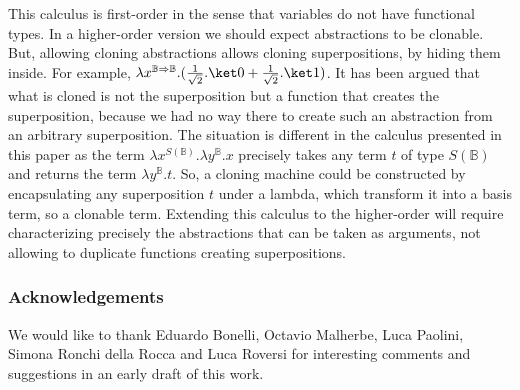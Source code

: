 \documentclass[preprint]{elsarticle}
\newcommand\B{\ensuremath{\mathbb B}}
\newcommand\pair[2]{({#1}+{#2})}
\begin{document}
This calculus is first-order in the sense that variables do not have functional
types. In a higher-order version we should expect abstractions to be clonable.
But, allowing cloning abstractions allows cloning superpositions, by hiding them
inside. For example, $\lambda x^{\B\Rightarrow\B}.\pair{\frac 1{\sqrt 2}.\ket
  0}{\frac 1{\sqrt 2}.\ket 1}$. It has been argued
\cite{ArrighiDowekRTA08,ArrighiDiazcaroValironIC17} that what is cloned is not
the superposition but a function that creates the superposition, because we had
no way there to create such an abstraction from an arbitrary superposition. The
situation is different in the calculus presented in this paper as the term
$\lambda x^{S(\B)}.\lambda y^{\B}.x$ precisely takes any term $t$ of type
$S(\B)$ and returns the term $\lambda y^{\B}.t$. So, a cloning machine could be
constructed by encapsulating any superposition $t$ under a lambda, which
transform it into a basis term, so a clonable term. Extending this calculus to
the higher-order will require characterizing precisely the abstractions that can
be taken as arguments, not allowing to duplicate functions creating
superpositions.

\subsubsection*{Acknowledgements}
We would like to thank Eduardo Bonelli, Octavio Malherbe, Luca Paolini, Simona
Ronchi della Rocca and Luca Roversi for interesting comments and suggestions in
an early draft of this work.


 

\newpage
\appendix
\end{document}
